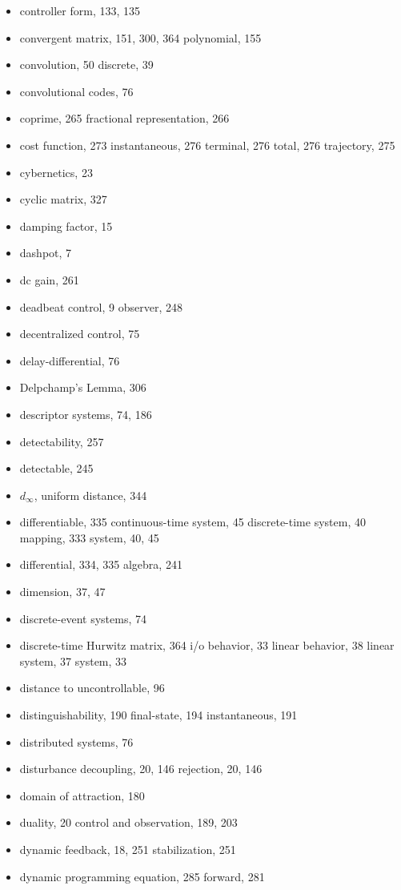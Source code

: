\begin{itemize}
  \item controller form, 133, 135
  \item convergent
    \subitem matrix, 151, 300, 364
    \subitem polynomial, 155
  \item convolution, 50
    \subitem discrete, 39
  \item convolutional codes, 76
  \item coprime, 265
    \subitem fractional representation, 266
  \item cost
    \subitem function, 273
    \subitem instantaneous, 276
    \subitem terminal, 276
    \subitem total, 276
    \subitem trajectory, 275
  \item cybernetics, 23
  \item cyclic matrix, 327

  \indexspace

  \item damping factor, 15
  \item dashpot, 7
  \item dc gain, 261
  \item deadbeat
    \subitem control, 9
    \subitem observer, 248
  \item decentralized control, 75
  \item delay-differential, 76
  \item Delpchamp's Lemma, 306
  \item descriptor systems, 74, 186
  \item detectability, 257
  \item detectable, 245
  \item $d_\infty $, uniform distance, 344
  \item differentiable, 335
    \subitem continuous-time system, 45
    \subitem discrete-time system, 40
    \subitem mapping, 333
    \subitem system, 40, 45
  \item differential, 334, 335
    \subitem algebra, 241
  \item dimension, 37, 47
  \item discrete-event systems, 74
  \item discrete-time
    \subitem Hurwitz matrix, 364
    \subitem i/o behavior, 33
    \subitem linear behavior, 38
    \subitem linear system, 37
    \subitem system, 33
  \item distance to uncontrollable, 96
  \item distinguishability, 190
    \subitem final-state, 194
    \subitem instantaneous, 191
  \item distributed systems, 76
  \item disturbance
    \subitem decoupling, 20, 146
    \subitem rejection, 20, 146
  \item domain of attraction, 180
  \item duality, 20
    \subitem control and observation, 189, 203
  \item dynamic
    \subitem feedback, 18, 251
    \subitem stabilization, 251
  \item dynamic programming
    \subitem equation, 285
    \subitem forward, 281


\end{itemize}
